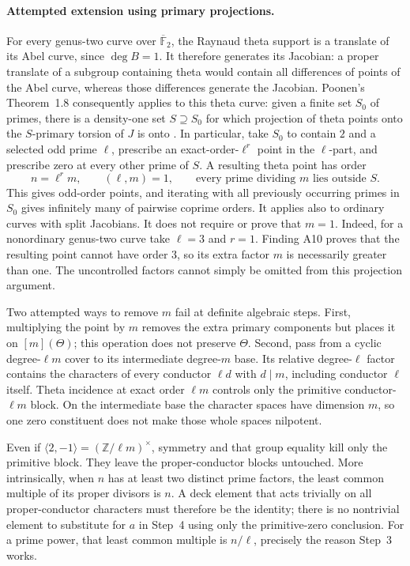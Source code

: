 \paragraph{Attempted extension using primary projections.}
For every genus-two curve over $\overline{\mathbb F}_2$, the
Raynaud theta support is a translate of its Abel curve, since
$\deg B=1$. It therefore generates its Jacobian: a proper translate
of a subgroup containing theta would contain all differences of
points of the Abel curve, whereas those differences generate the
Jacobian.
Poonen's Theorem~1.8 consequently applies to this theta curve:
given a finite set $S_0$ of primes, there is a density-one set
$S\supseteq S_0$ for which projection of theta points onto the
$S$-primary torsion of $J$ is onto \cite[Theorem~1.8]{Poonen2005}.
In particular, take $S_0$ to contain $2$ and a selected odd prime
$\ell$, prescribe an exact-order-$\ell^r$ point in the $\ell$-part,
and prescribe zero at every other prime of $S$. A resulting theta
point has order
\[
 n=\ell^r m,\qquad (\ell,m)=1,\qquad
 \text{every prime dividing }m\text{ lies outside }S.
 \tag{PR.9}
\]
This gives odd-order points, and iterating with all previously
occurring primes in $S_0$ gives infinitely many of pairwise coprime
orders. It applies also to ordinary curves with split Jacobians.
It does not require or prove that $m=1$.
Indeed, for a nonordinary genus-two curve take $\ell=3$ and $r=1$.
Finding A10 proves that the resulting point cannot have order $3$,
so its extra factor $m$ is necessarily greater than one. The
uncontrolled factors cannot simply be omitted from this projection
argument.

Two attempted ways to remove $m$ fail at definite algebraic steps.
First, multiplying the point by $m$ removes the extra primary
components but places it on $[m](\Theta)$; this operation does not
preserve $\Theta$. Second, pass from a cyclic degree-$\ell m$
cover to its intermediate degree-$m$ base. Its relative
degree-$\ell$ factor contains the characters of every conductor
$\ell d$ with $d\mid m$, including conductor $\ell$ itself.
Theta incidence at exact order $\ell m$ controls only the
primitive conductor-$\ell m$ block. On the intermediate base the
character spaces have dimension $m$, so one zero constituent does
not make those whole spaces nilpotent.

Even if $\langle2,-1\rangle=(\mathbb Z/\ell m)^\times$, symmetry
and that group equality kill only the primitive block. They leave
the proper-conductor blocks untouched. More intrinsically, when
$n$ has at least two distinct prime factors, the least common
multiple of its proper divisors is $n$. A deck element that acts
trivially on all proper-conductor characters must therefore be
the identity; there is no nontrivial element to substitute for
$a$ in Step~4 using only the primitive-zero conclusion. For a prime
power, that least common multiple is $n/\ell$, precisely the
reason Step~3 works.

